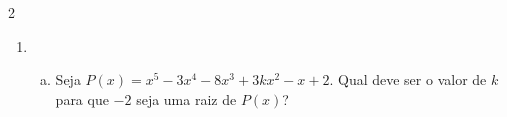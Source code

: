 \documentclass[a4paper,14pt]{article}
\begin{document}
\begin{multicols}{2}
\begin{enumerate}
\begin{enumerate}[a)]
            	\item $x^2 - 4x -12$ \\\\\\\\\\\\\\
            	\item $x^2 + 2x + 9$ \\\\\\\\\\\\\\
            	\item $(x + 3)(x - 3)$ \\\\\\\\\\\\\\
            	\item $(x + 4)(x^2 + 5x + 6)$ \\\\\\\\\\\\\\
            	\item $(3x - 6)(x + 5)(x - 6)^2$ \\\\\\\\\\\\\\
            	\item $(x^2 - 9)(x^2 - 16)$ \\\\\\\\\\\\\\
            \end{enumerate}
        	\item
        	\begin{enumerate}[a)]
        		\item Seja $P(x) = x^5 - 3x^4 - 8x^3 + 3kx^2 - x + 2$. Qual deve ser o valor de $k$ para que $-2$ seja uma raiz de $P(x)$? \\\\\\\\\\\\\\

\end{enumerate}
\end{enumerate}
\end{multicols}
\end{document}

